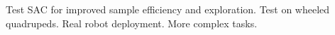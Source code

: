 \begin{Large}
	\vskip1cm
	Test SAC for improved sample efficiency and exploration. Test on wheeled quadrupeds. Real robot deployment. More complex tasks.\\
	\vskip2cm
\end{Large}